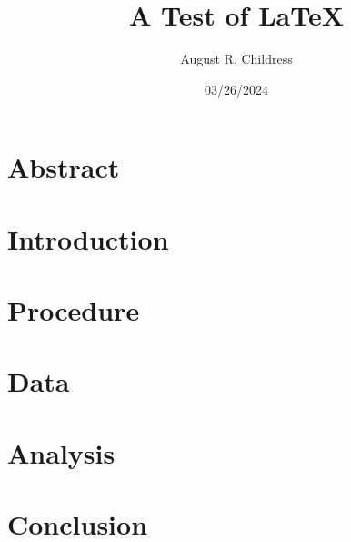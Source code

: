 \documentclass{article}
\author{August R. Childress}
\title{A Test of LaTeX}
\date{03/26/2024}
\begin{document}
\maketitle

\section{Abstract}


\section{Introduction}


\section{Procedure}


\section{Data}


\section{Analysis}


\section{Conclusion}




\end{document}
